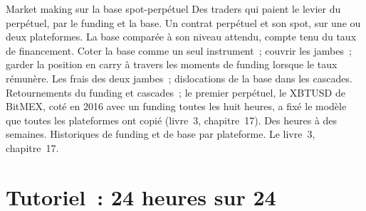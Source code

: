 \begin{strategyfile}{Market making sur la base spot-perpétuel}\label{strat:hf:crypto-high-frequency-trading-on-centralised-venues:basis}
 Des traders qui paient le levier du perpétuel, par le funding et la base.
 Un contrat perpétuel et son spot, sur une ou deux plateformes.
 La base comparée à son niveau attendu, compte tenu du taux de financement.
 Coter la base comme un seul instrument~; couvrir les jambes~; garder la position en carry à travers les moments de funding lorsque le taux rémunère.
 Les frais des deux jambes~; dislocations de la base dans les cascades.
 Retournements du funding et cascades~; le premier perpétuel, le XBTUSD de BitMEX, coté en 2016 avec un funding toutes les huit heures, a fixé le modèle
que toutes les plateformes ont copié (livre~3, chapitre~17).
 Des heures à des semaines.
 Historiques de funding et de base par plateforme.
 Le livre~3, chapitre~17.
\end{strategyfile}

\section{Tutoriel~: 24 heures sur 24}\label{tut:hf:crypto-high-frequency-trading-on-centralised-venues:tut}

